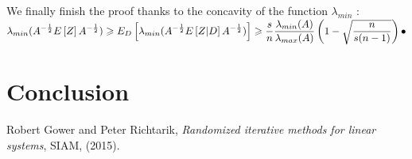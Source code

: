 We finally finish the proof thanks to the concavity of the function $\lambda_{min}$ :\\
  $\displaystyle \lambda_{min}(A^{-\frac12}E\left[Z\right]A^{-\frac12} ) \geqslant E_{D}\left[\lambda_{min}(A^{-\frac12}E\left[Z|D\right]A^{-\frac12} )\right] \geqslant \frac{s}{n} \frac{\lambda_{min}(A)}{\lambda_{max}(A)}\left(1-\sqrt{\frac{n}{s(n-1)}}\right) \bullet$

 
\chapter{Conclusion}

\appendix
\begin{thebibliography}{1}

\bibitem{}
{\sc Robert Gower and Peter Richtarik}, {\em Randomized iterative methods for linear systems}, SIAM, 
  (2015).



\end{thebibliography}





